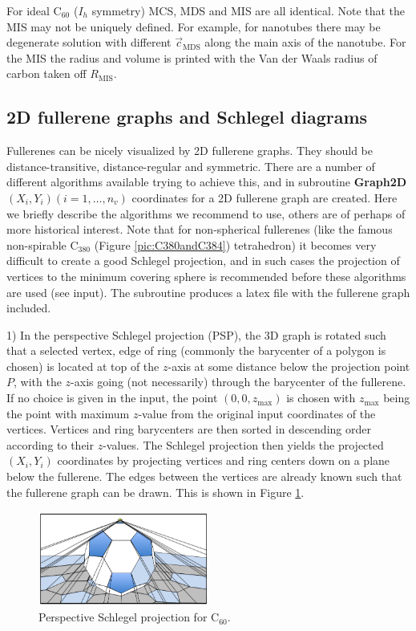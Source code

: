 \documentclass[article,a4paper,twoside]{memoir}
\newcommand{\C}[1]{\ensuremath{\mathrm{C}_{#1}}}
\newcommand{\funname}[1]{{\color{blue}\textbf{#1}}}
\begin{document}
For ideal \C{60} ($I_h$ symmetry) MCS, MDS and MIS are all identical. Note that the MIS may not be uniquely defined. For example, for nanotubes
there may be degenerate solution with different $\vec{c}_{\mathrm{MDS}}$ along the main axis of the nanotube.
For the MIS the radius and volume is printed  with the Van der Waals radius of carbon taken off $R_{\mathrm{MIS}}$. 

\subsection{2D fullerene graphs and Schlegel diagrams}
Fullerenes can be nicely visualized by 2D fullerene graphs. They should be distance-transitive, distance-regular and 
symmetric. There are a number of different algorithms available trying to achieve this, and in subroutine \funname{Graph2D} $(X_i,Y_i) (i=1,\dots, n_v)$ 
coordinates for a 2D fullerene graph are created. Here we briefly describe the algorithms we recommend to use,
others are of perhaps of more historical interest. Note that for non-spherical fullerenes (like the famous non-spirable \C{380} (Figure  \ref{pic:C380andC384})
tetrahedron) it becomes very difficult to create a good Schlegel projection, and in such cases the projection of vertices to the minimum
covering sphere is recommended before these algorithms are used (see input). The subroutine produces a latex file with the fullerene graph included.

1) In the perspective Schlegel projection (PSP), the 3D graph is rotated such that a selected vertex, edge of ring 
(commonly the barycenter of a polygon is chosen) is located at top of the $z$-axis at some distance below the projection point $P$, 
with the $z$-axis going (not necessarily) through the barycenter of the fullerene. If no choice is given in the input, the point $(0,0,z_{\mathrm{max}})$ 
is chosen with $z_{\mathrm{max}}$ being the point with maximum $z$-value from the original input coordinates of the vertices. 
Vertices and ring barycenters are then sorted in descending order according to their $z$-values.
The Schlegel projection then yields the projected $(X_i,Y_i)$ coordinates by projecting vertices and ring centers 
down on a plane below the fullerene.  The edges between the vertices are already known such that the fullerene graph can be drawn. 
This is shown in Figure \ref{pic:Schlegel}.

 \begin{figure}[htbp]
   	\centering
  	\includegraphics[width=0.5\textwidth]{Schlegel.png}
    \caption{Perspective Schlegel projection for \C{60}.}
	\label{pic:Schlegel}
 \end{figure}
\end{document}
